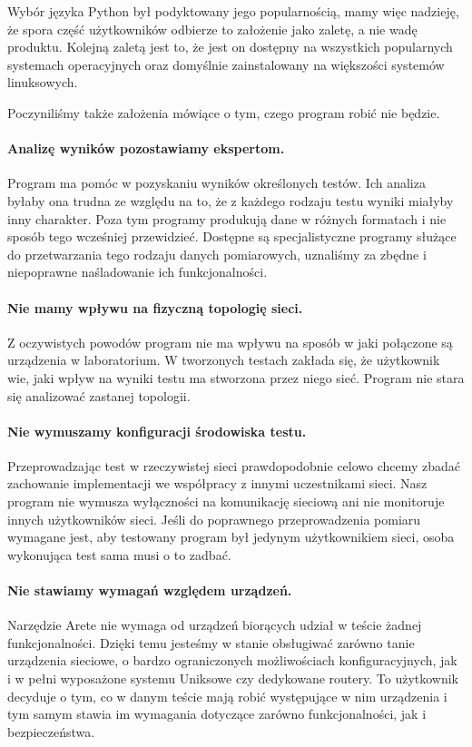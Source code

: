\documentclass[00-praca-magisterska.tex]{subfiles}
\begin{document}
Wybór języka Python był podyktowany jego popularnością, mamy więc nadzieję, że
spora część użytkowników odbierze to założenie jako zaletę, a nie wadę
produktu. Kolejną zaletą jest to, że jest on dostępny na wszystkich popularnych
systemach operacyjnych oraz domyślnie zainstalowany na większości systemów
linuksowych.

Poczyniliśmy także założenia mówiące o tym, czego program robić nie będzie.

\paragraph{Analizę wyników pozostawiamy ekspertom.} Program ma pomóc w
pozyskaniu wyników określonych testów. Ich analiza byłaby ona trudna ze
względu na to, że z każdego rodzaju testu wyniki miałyby inny charakter. Poza
tym programy produkują dane w różnych formatach i nie sposób tego wcześniej
przewidzieć. Dostępne są specjalistyczne programy służące do przetwarzania tego
rodzaju danych pomiarowych, uznaliśmy za zbędne i niepoprawne naśladowanie ich
funkcjonalności.

\paragraph{Nie mamy wpływu na fizyczną topologię sieci.} Z oczywistych powodów
program nie ma wpływu na sposób w jaki połączone są urządzenia w laboratorium. W
tworzonych testach zakłada się, że użytkownik wie, jaki wpływ na wyniki testu ma
stworzona przez niego sieć. Program nie stara się analizować zastanej topologii.

\paragraph{Nie wymuszamy konfiguracji środowiska testu.} Przeprowadzając test w
rzeczywistej sieci prawdopodobnie celowo chcemy zbadać zachowanie implementacji
we współpracy z innymi uczestnikami sieci. Nasz program nie wymusza wyłączności
na komunikację sieciową ani nie monitoruje innych użytkowników sieci. Jeśli do
poprawnego przeprowadzenia pomiaru wymagane jest, aby testowany program był
jedynym użytkownikiem sieci, osoba wykonująca test sama musi o to zadbać.

\paragraph{Nie stawiamy wymagań względem urządzeń.} Narzędzie Arete nie
wymaga od urządzeń biorących udział w teście żadnej funkcjonalności.
Dzięki temu jesteśmy w stanie obsługiwać zarówno tanie urządzenia sieciowe, o
bardzo ograniczonych możliwościach konfiguracyjnych, jak i w pełni wyposażone
systemu Uniksowe czy dedykowane routery. To użytkownik decyduje o tym, co w
danym teście mają robić występujące w nim urządzenia i tym samym stawia
im wymagania dotyczące zarówno funkcjonalności, jak i bezpieczeństwa.
\end{document}
